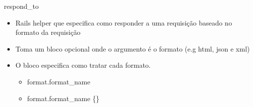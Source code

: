 \begin{frame}{respond_to}
	\begin{itemize}
		\item Rails helper que \alert{especifica como responder a uma requisição} baseado no 
			formato da requisição
		\item Toma um bloco opcional onde o argumento é o formato (e.g html, json e xml)
		\item O bloco especifica \alert{como tratar} cada formato.
		\begin{itemize}	
			\item \alert{format.format_name}
			\item \alert{format.format_name \{\}}
		\end{itemize}	
	\end{itemize}	
\end{frame}